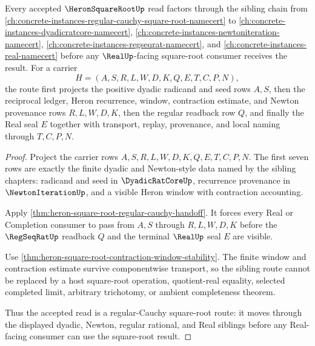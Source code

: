 \begin{theorem}
\label{thm:heron-square-root-regular-cauchy-sibling-route}
Every accepted $\HeronSquareRootUp$ read factors through the sibling chain from \autoref{ch:concrete-instances-regular-cauchy-square-root-namecert} to \autoref{ch:concrete-instances-dyadicratcore-namecert}, \autoref{ch:concrete-instances-newtoniteration-namecert}, \autoref{ch:concrete-instances-regseqrat-namecert}, and \autoref{ch:concrete-instances-real-namecert} before any $\RealUp$-facing square-root consumer receives the result. For a carrier
$$
H=(A,S,R,L,W,D,K,Q,E,T,C,P,N),
$$
the route first projects the positive dyadic radicand and seed rows $A,S$, then the reciprocal ledger, Heron recurrence, window, contraction estimate, and Newton provenance rows $R,L,W,D,K$, then the regular readback row $Q$, and finally the Real seal $E$ together with transport, replay, provenance, and local naming through $T,C,P,N$.
\end{theorem}
\begin{proof}
Project the carrier rows $A,S,R,L,W,D,K,Q,E,T,C,P,N$. The first seven rows are exactly the finite dyadic and Newton-style data named by the sibling chapters: radicand and seed in $\DyadicRatCoreUp$, recurrence provenance in $\NewtonIterationUp$, and a visible Heron window with contraction accounting.

Apply \autoref{thm:heron-square-root-regular-cauchy-handoff}. It forces every Real or Completion consumer to pass from $A,S$ through $R,L,W,D,K$ before the $\RegSeqRatUp$ readback $Q$ and the terminal $\RealUp$ seal $E$ are visible.

Use \autoref{thm:heron-square-root-contraction-window-stability}. The finite window and contraction estimate survive componentwise transport, so the sibling route cannot be replaced by a host square-root operation, quotient-real equality, selected completed limit, arbitrary trichotomy, or ambient completeness theorem.

Thus the accepted read is a regular-Cauchy square-root route: it moves through the displayed dyadic, Newton, regular rational, and Real siblings before any Real-facing consumer can use the square-root result.
\end{proof}

